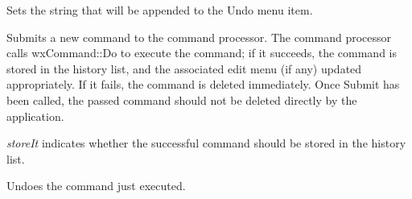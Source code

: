 
Sets the string that will be appended to the Undo menu item.



Submits a new command to the command processor. The command processor
calls wxCommand::Do to execute the command; if it succeeds, the command
is stored in the history list, and the associated edit menu (if any) updated
appropriately. If it fails, the command is deleted
immediately. Once Submit has been called, the passed command should not
be deleted directly by the application.

{\it storeIt} indicates whether the successful command should be stored
in the history list.



Undoes the command just executed.


